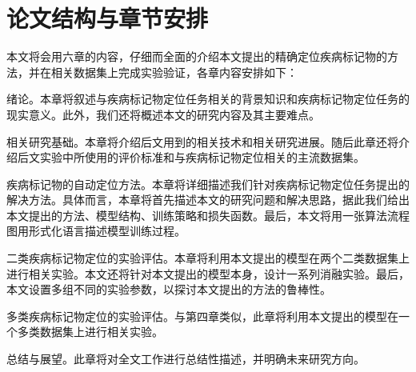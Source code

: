 \section{论文结构与章节安排}\label{sec:arrangement}
本文将会用六章的内容，仔细而全面的介绍本文提出的精确定位疾病标记物的方法，并在相关数据集上完成实验验证，各章内容安排如下：
\begin{description}[style=multiline,leftmargin=1.7cm]
	\item[第一章：] 绪论。本章将叙述与疾病标记物定位任务相关的背景知识和疾病标记物定位任务的现实意义。此外，我们还将概述本文的研究内容及其主要难点。
	\item[第二章：] 相关研究基础。本章将介绍后文用到的相关技术和相关研究进展。随后此章还将介绍后文实验中所使用的评价标准和与疾病标记物定位相关的主流数据集。
	\item[第三章：] 疾病标记物的自动定位方法。本章将详细描述我们针对疾病标记物定位任务提出的解决方法。具体而言，本章将首先描述本文的研究问题和解决思路，据此我们给出本文提出的方法、模型结构、训练策略和损失函数。最后，本文将用一张算法流程图用形式化语言描述模型训练过程。
	\item[第四章：] 二类疾病标记物定位的实验评估。本章将利用本文提出的模型在两个二类数据集上进行相关实验。本文还将针对本文提出的模型本身，设计一系列消融实验。最后，本文设置多组不同的实验参数，以探讨本文提出的方法的鲁棒性。
	\item[第五章：] 多类疾病标记物定位的实验评估。与第四章类似，此章将利用本文提出的模型在一个多类数据集上进行相关实验。
	\item[第六章：] 总结与展望。此章将对全文工作进行总结性描述，并明确未来研究方向。
\end{description}